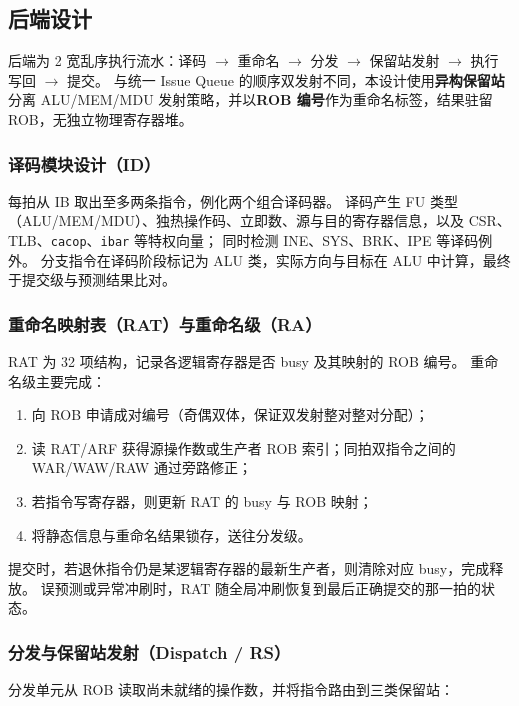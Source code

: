 \subsection{后端设计}

后端为 2 宽乱序执行流水：译码 $\rightarrow$ 重命名 $\rightarrow$ 分发 $\rightarrow$ 保留站发射 $\rightarrow$ 执行写回 $\rightarrow$ 提交。
与统一 Issue Queue 的顺序双发射不同，本设计使用\textbf{异构保留站}分离 ALU/MEM/MDU 发射策略，并以\textbf{ROB 编号}作为重命名标签，结果驻留 ROB，无独立物理寄存器堆。

\subsubsection{译码模块设计（ID）}

每拍从 IB 取出至多两条指令，例化两个组合译码器。
译码产生 FU 类型（ALU/MEM/MDU）、独热操作码、立即数、源与目的寄存器信息，以及 CSR、TLB、\texttt{cacop}、\texttt{ibar} 等特权向量；
同时检测 INE、SYS、BRK、IPE 等译码例外。
分支指令在译码阶段标记为 ALU 类，实际方向与目标在 ALU 中计算，最终于提交级与预测结果比对。

\subsubsection{重命名映射表（RAT）与重命名级（RA）}

RAT 为 32 项结构，记录各逻辑寄存器是否 busy 及其映射的 ROB 编号。
重命名级主要完成：

\begin{enumerate}
  \item 向 ROB 申请成对编号（奇偶双体，保证双发射整对整对分配）；
  \item 读 RAT/ARF 获得源操作数或生产者 ROB 索引；同拍双指令之间的 WAR/WAW/RAW 通过旁路修正；
  \item 若指令写寄存器，则更新 RAT 的 busy 与 ROB 映射；
  \item 将静态信息与重命名结果锁存，送往分发级。
\end{enumerate}

提交时，若退休指令仍是某逻辑寄存器的最新生产者，则清除对应 busy，完成释放。
误预测或异常冲刷时，RAT 随全局冲刷恢复到最后正确提交的那一拍的状态。

\subsubsection{分发与保留站发射（Dispatch / RS）}

分发单元从 ROB 读取尚未就绪的操作数，并将指令路由到三类保留站：

